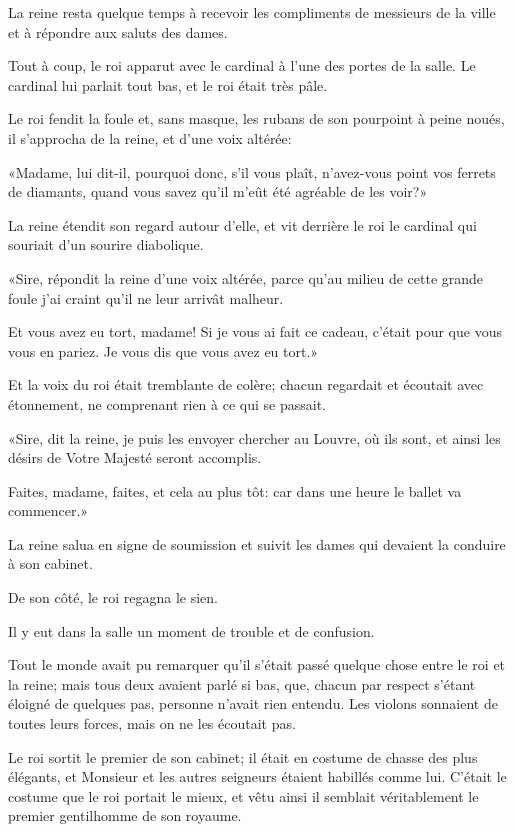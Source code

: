 La reine resta quelque temps à recevoir les compliments de messieurs de la ville et à répondre aux saluts des dames. 

Tout à coup, le roi apparut avec le cardinal à l'une des portes de la salle. Le cardinal lui parlait tout bas, et le roi était très pâle. 

Le roi fendit la foule et, sans masque, les rubans de son pourpoint à peine noués, il s'approcha de la reine, et d'une voix altérée: 

«Madame, lui dit-il, pourquoi donc, s'il vous plaît, n'avez-vous point vos ferrets de diamants, quand vous savez qu'il m'eût été agréable de les voir?» 

La reine étendit son regard autour d'elle, et vit derrière le roi le cardinal qui souriait d'un sourire diabolique. 

«Sire, répondit la reine d'une voix altérée, parce qu'au milieu de cette grande foule j'ai craint qu'il ne leur arrivât malheur. 

\speak  Et vous avez eu tort, madame! Si je vous ai fait ce cadeau, c'était pour que vous vous en pariez. Je vous dis que vous avez eu tort.» 

Et la voix du roi était tremblante de colère; chacun regardait et écoutait avec étonnement, ne comprenant rien à ce qui se passait. 

«Sire, dit la reine, je puis les envoyer chercher au Louvre, où ils sont, et ainsi les désirs de Votre Majesté seront accomplis. 

\speak  Faites, madame, faites, et cela au plus tôt: car dans une heure le ballet va commencer.» 

La reine salua en signe de soumission et suivit les dames qui devaient la conduire à son cabinet. 

De son côté, le roi regagna le sien. 

Il y eut dans la salle un moment de trouble et de confusion. 

Tout le monde avait pu remarquer qu'il s'était passé quelque chose entre le roi et la reine; mais tous deux avaient parlé si bas, que, chacun par respect s'étant éloigné de quelques pas, personne n'avait rien entendu. Les violons sonnaient de toutes leurs forces, mais on ne les écoutait pas. 

Le roi sortit le premier de son cabinet; il était en costume de chasse des plus élégants, et Monsieur et les autres seigneurs étaient habillés comme lui. C'était le costume que le roi portait le mieux, et vêtu ainsi il semblait véritablement le premier gentilhomme de son royaume. 

